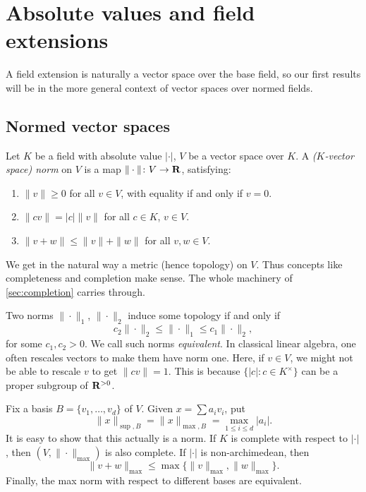 \section{Absolute values and field extensions}\label{sec:abs-val-field-ext}

A field extension is naturally a vector space over the base field, so our 
first results will be in the more general context of vector spaces over 
normed fields. 



\subsection{Normed vector spaces}

\begin{definition}
Let $K$ be a field with absolute value $|\cdot|$, $V$ be a vector space over 
$K$. A \emph{($K$-vector space) norm} on $V$ is a map 
$\|\cdot\|\colon V\to \mathbf{R}$, satisfying: 
\begin{enumerate}
\item 
$\|v\|\geqslant 0$ for all $v\in V$, with equality if and only if $v=0$. 

\item
$\|c v\| = |c|\|v\|$ for all $c\in K$, $v\in V$. 

\item
$\|v+w\|\leqslant \|v\|+\|w\|$ for all $v,w\in V$. 
\end{enumerate}
\end{definition}

We get in the natural way a metric (hence topology) on $V$. Thus concepts like 
completeness and completion make sense. The whole machinery of 
\autoref{sec:completion} carries through. 

Two norms $\|\cdot\|_1$, $\|\cdot\|_2$ induce some topology if and only if 
\[
  c_2 \|\cdot\|_2 \leqslant \|\cdot\|_1 \leqslant c_1 \|\cdot\|_2 ,
\]
for some $c_1,c_2>0$. We call such norms \emph{equivalent}. 
In classical linear algebra, one often rescales vectors 
to make them have norm one. Here, if $v\in V$, we might not be able to 
rescale $v$ to get $\|cv\|=1$. This is because $\{|c|\colon c\in K^\times\}$ 
can be a proper subgroup of $\mathbf{R}^{>0}$. 

\begin{example}
Fix a basis $B=\{v_1,\dots,v_d\}$ of $V$. Given $x=\sum a_i v_i$, put 
\[
  \|x\|_{\sup,B} = \|x\|_{\max,B} = \max_{1\leqslant i\leqslant d} |a_i| .
\]
It is easy to show that this actually is a norm. If $K$ is complete with 
respect to $|\cdot|$, then $(V,\|\cdot\|_{\max})$ is also complete. If 
$|\cdot|$ is non-archimedean, then 
\[
  \|v+w\|_{\max} \leqslant \max\{\|v\|_{\max},\|w\|_{\max}\} .
\]
Finally, the max norm with respect to different bases are equivalent. 
\end{example}

